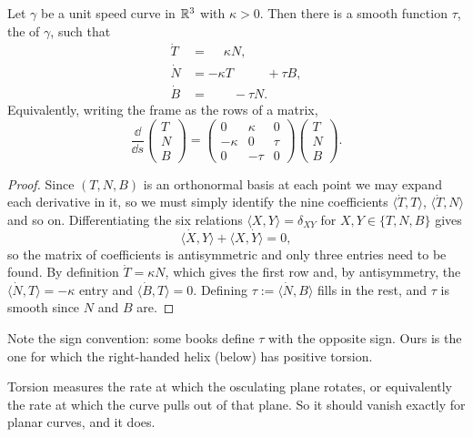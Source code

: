\documentclass[a4paper]{scrartcl}
\begin{document}
\begin{theorem}
    Let $\gamma$ be a unit speed curve in $\mathbb{R}^3$ with $\kappa > 0$. Then there is a smooth function $\tau$, the  of $\gamma$, such that
    \begin{align*}
        \dot T &= \phantom{-}\kappa N, \\
        \dot N &= -\kappa T \phantom{{}+ \kappa N} + \tau B, \\
        \dot B &= \phantom{-\kappa T{}} - \tau N.
    \end{align*}
    Equivalently, writing the frame as the rows of a matrix,
    $$
    \frac{\dd}{\dd s}\begin{pmatrix} T \\ N \\ B\end{pmatrix} = \begin{pmatrix} 0 & \kappa & 0 \\ -\kappa & 0 & \tau \\ 0 & -\tau & 0\end{pmatrix}\begin{pmatrix} T \\ N \\ B \end{pmatrix}.
    $$
\end{theorem}
\begin{proof}
    Since $(T, N, B)$ is an orthonormal basis at each point we may expand each derivative in it, so we must simply identify the nine coefficients $\langle \dot T, T\rangle$, $\langle \dot T, N\rangle$ and so on. Differentiating the six relations $\langle X, Y \rangle = \delta_{XY}$ for $X, Y \in \{T, N, B\}$ gives
    $$
    \langle \dot X, Y \rangle + \langle X, \dot Y \rangle = 0,
    $$
    so the matrix of coefficients is antisymmetric and only three entries need to be found. By definition $\dot T = \kappa N$, which gives the first row and, by antisymmetry, the $\langle \dot N, T\rangle = -\kappa$ entry and $\langle \dot B, T \rangle = 0$. Defining $\tau := \langle \dot N, B \rangle$ fills in the rest, and $\tau$ is smooth since $N$ and $B$ are.
\end{proof}

\begin{remark}
    Note the sign convention: some books define $\tau$ with the opposite sign. Ours is the one for which the right-handed helix (below) has positive torsion.
\end{remark}

Torsion measures the rate at which the osculating plane rotates, or equivalently the rate at which the curve pulls out of that plane. So it should vanish exactly for planar curves, and it does.
\end{document}
